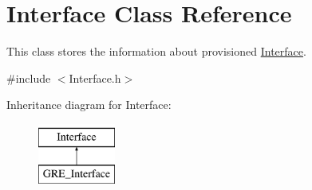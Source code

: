 \hypertarget{classInterface}{\section{\-Interface \-Class \-Reference}
\label{classInterface}
}


\-This class stores the information about provisioned \hyperlink{classInterface}{\-Interface}.  




{\ttfamily \#include $<$\-Interface.\-h$>$}

\-Inheritance diagram for \-Interface\-:\begin{figure}[H]
\begin{center}
\leavevmode
\includegraphics[height=2.000000cm]{classInterface}
\end{center}
\end{figure}
